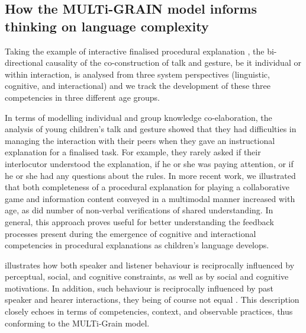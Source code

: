 \documentclass[output=paper]{langscibook}
\begin{document}
\subsection{How the MULTi-GRAIN model informs thinking on language complexity}

Taking the example of interactive finalised procedural explanation \citep{Mazur-PalandreEtAl2014}, the bi-directional causality of the co-construction of talk and gesture, be it individual or within interaction, is analysed from three system perspectives (linguistic, cognitive, and interactional) and we track the development of these three competencies in three different age groups.

In terms of modelling individual and group knowledge co-elaboration, the analysis of young children’s talk and gesture showed that they had difficulties in managing the interaction with their peers when they gave an instructional explanation for a finalised task. For example, they rarely asked if their interlocutor understood the explanation, if he or she was paying attention, or if he or she had any questions about the rules. In more recent work, we illustrated \citep{Mazur-PalandreEtAl2019} that both completeness of a procedural explanation for playing a collaborative game and information content conveyed in a multimodal manner increased with age, as did number of non-verbal verifications of shared understanding. In general, this approach proves useful for better understanding the feedback processes present during the emergence of cognitive and interactional competencies in procedural explanations as children’s language develops.

 illustrates how both speaker and listener behaviour is reciprocally influenced by perceptual, social, and cognitive constraints, as well as by social and cognitive motivations. In addition, such behaviour is reciprocally influenced by past speaker and hearer interactions, they being of course not equal \citep{BecknerEtAl2009}. This description closely echoes \citet{Lahire2012} in terms of competencies, context, and observable practices, thus conforming to the MULTi-Grain model.
\end{document}
